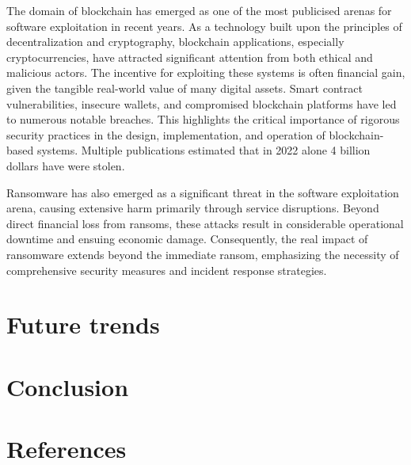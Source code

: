 \documentclass{article}
\begin{document}
The domain of blockchain has emerged as one of the most publicised arenas for
software exploitation in recent years. As a technology built upon the principles
of decentralization and cryptography, blockchain applications, especially
cryptocurrencies, have attracted significant attention from both ethical and
malicious actors. The incentive for exploiting these systems is often financial
gain, given the tangible real-world value of many digital assets. Smart contract
vulnerabilities, insecure wallets, and compromised blockchain platforms have led
to numerous notable breaches. This highlights the critical importance of
rigorous security practices in the design, implementation, and operation of
blockchain-based systems. Multiple publications estimated that in 2022 alone
4 billion dollars have were stolen.

Ransomware has also emerged as a significant threat in the software exploitation
arena, causing extensive harm primarily through service disruptions. Beyond
direct financial loss from ransoms, these attacks result in considerable
operational downtime and ensuing economic damage. Consequently, the real impact
of ransomware extends beyond the immediate ransom, emphasizing the necessity of
comprehensive security measures and incident response strategies.

\section{Future trends}%



\section{Conclusion}%


\section{References}%
\end{document}
